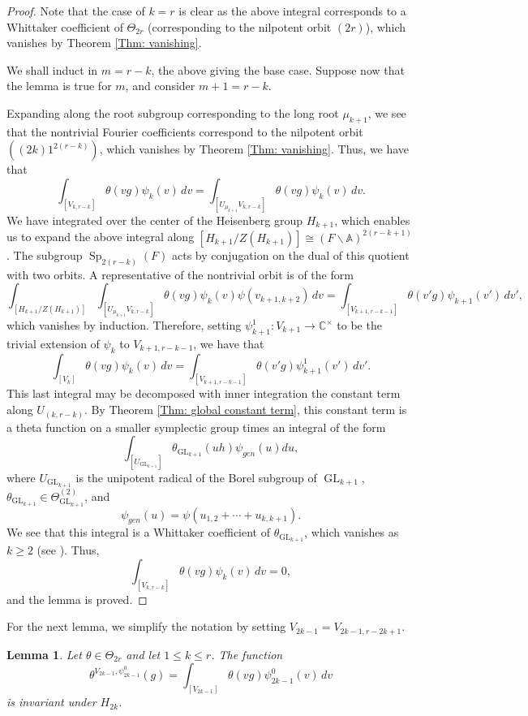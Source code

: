 \documentclass[11pt,reqno]{amsart}
\newtheorem{Lem}[Thm]{Lemma}
\theoremstyle{definition}
\theoremstyle{remark}
\theoremstyle{definition}
\begin{document}
\begin{proof}
Note that the case of $k=r$ is clear as the above integral corresponds to a Whittaker coefficient of $\Theta_{2r}$ (corresponding to the nilpotent orbit $(2r)$), which vanishes by Theorem \ref{Thm: vanishing}.

We shall induct in $m=r-k$, the above giving the base case. Suppose now that the lemma is true for $m$, and consider $m+1=r-k$. 

Expanding along the root subgroup corresponding to the long root $\mu_{k+1}$, we see that the nontrivial Fourier coefficients correspond to the nilpotent orbit $((2k)1^{2(r-k)})$, which vanishes by Theorem \ref{Thm: vanishing}. Thus, we have that
\[
\int_{[V_{k,r-k}]}\theta(vg)\psi_k(v)\,dv = \int_{[U_{\mu_{k+1}}V_{k,r-k}]}\theta(vg)\psi_k(v)\,dv.
\]
We have integrated over the center of the Heisenberg group $H_{k+1}$, which enables us to expand the above integral along $[H_{k+1}/Z(H_{k+1})]\cong (F\backslash{\mathbb A})^{2(r-k+1)}$. The subgroup $\operatorname{Sp}_{2(r-k)}(F)$ acts by conjugation on the dual of this quotient with two orbits. A representative of the nontrivial orbit is of the form
\[
\int_{[H_{k+1}/Z(H_{k+1})]}\int_{[U_{\mu_{k+1}}V_{k,r-k}]}\theta(vg)\psi_k(v)\psi(v_{k+1,k+2})\,dv = \int_{[V_{k+1,r-k-1}]}\theta(v'g)\psi_{k+1}(v')\,dv',
\]
which vanishes by induction. Therefore, setting $\psi_{k+1}^1:V_{k+1}\to{\mathbb C}^\times$ to be the trivial extension of $\psi_k$ to $V_{k+1,r-k-1}$, we have that
\[
\int_{[V_k]}\theta(vg)\psi_k(v)\,dv =\int_{[V_{k+1,r-k-1}]}\theta(v'g)\psi_{k+1}^1(v')\,dv'.
\]
This last integral may be decomposed with inner integration the constant term along $U_{(k,r-k)}$. By Theorem \ref{Thm: global constant term}, this constant term is a theta function on a smaller symplectic group times an integral of the form
\[
\int_{[U_{\operatorname{GL}_{k+1}}]}\theta_{\operatorname{GL}_{k+1}}(uh)\psi_{gen}(u)du,
\]
where $U_{\operatorname{GL}_{k+1}}$ is the unipotent radical of the Borel subgroup of $\operatorname{GL}_{k+1}$, $\theta_{\operatorname{GL}_{k+1}}\in \Theta_{\operatorname{GL}_{k+1}}^{(2)}$, and
\[
\psi_{gen}(u) = \psi(u_{1,2}+\cdots + u_{k,k+1}).
\]
We see that this integral is a Whittaker coefficient of $\theta_{\operatorname{GL}_{k+1}}$, which vanishes as $k\geq 2$ (see \cite{KP}). Thus,
\[
\int_{[V_{k,r-k}]}\theta(vg)\psi_k(v)\,dv =0,
\]
and the lemma is proved.
\end{proof}
For the next lemma, we simplify the notation by setting $V_{2k-1}=V_{2k-1,r-2k+1}$. 
\begin{Lem}\label{Lem: lemma 2}
Let $\theta\in \Theta_{2r}$ and let $1\leq k\leq r$. The function
\[
\theta^{V_{2k-1},\psi^0_{2k-1}}(g) = \int_{[V_{2k-1}]}\theta(vg)\psi^0_{2k-1}(v)\,dv
\]
is invariant under $H_{2k}$.
\end{Lem}
\end{document}
